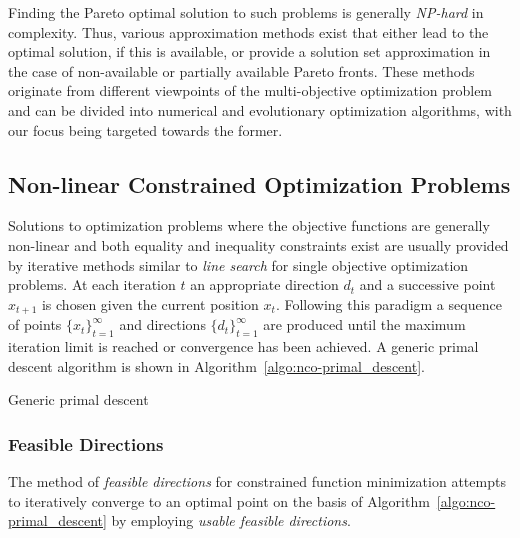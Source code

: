 Finding the Pareto optimal solution to such problems is generally \emph{NP-hard} in complexity. Thus, various approximation methods exist that either lead to the optimal solution, if this is available, or provide a solution set approximation in the case of non-available or partially available Pareto fronts. These methods originate from different viewpoints of the multi-objective optimization problem and can be divided into numerical and evolutionary optimization algorithms, with our focus being targeted towards the former.

\subsection{Non-linear Constrained Optimization Problems} \label{subsec:theorBack-NCOP}

Solutions to optimization problems where the objective functions are generally non-linear and both equality and inequality constraints exist are usually provided by iterative methods similar to \emph{line search} for single objective optimization problems. At each iteration $t$ an appropriate direction $d_t$ and a successive point $x_{t+1}$ is chosen given the current position $x_t$. Following this paradigm a sequence of points $\{x_t\}_{t=1}^\infty$ and directions $\{d_t\}_{t=1}^\infty$ are produced until the maximum iteration limit is reached or convergence has been achieved. A generic primal descent algorithm is shown in Algorithm~\ref{algo:nco-primal_descent}.

\begin{algorithm}[H]
\caption{Generic primal descent \label{algo:nco-primal_descent}} 
\end{algorithm}

\subsubsection{Feasible Directions} \label{subsubsec:theorBack-feasibleDir}

The method of \emph{feasible directions} for constrained function minimization attempts to iteratively converge to an optimal point on the basis of Algorithm~\ref{algo:nco-primal_descent} by employing \emph{usable feasible directions}.

